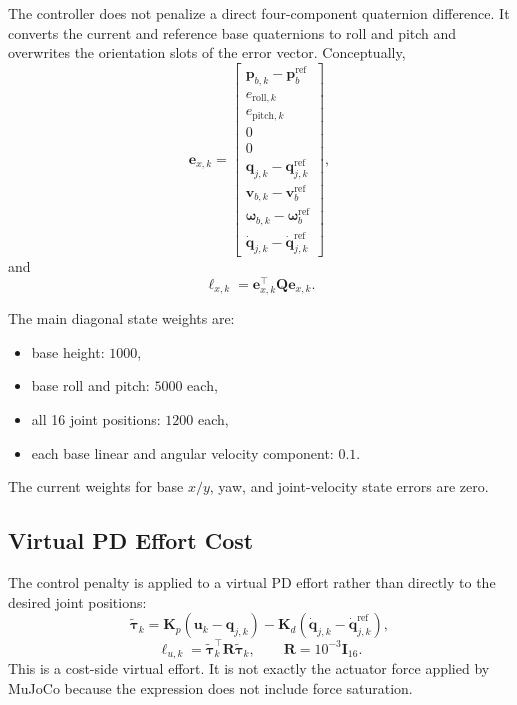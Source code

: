 \documentclass[11pt,a4paper]{article}
\begin{document}
The controller does not penalize a direct four-component quaternion
difference. It converts the current and reference base quaternions to roll and
pitch and overwrites the orientation slots of the error vector. Conceptually,
\begin{equation}
  \bm{e}_{x,k}=
  \begin{bmatrix}
    \bm{p}_{b,k}-\bm{p}^{\mathrm{ref}}_b\\
    e_{\mathrm{roll},k}\\
    e_{\mathrm{pitch},k}\\
    0\\
    0\\
    \bm{q}_{j,k}-\bm{q}^{\mathrm{ref}}_{j,k}\\
    \bm{v}_{b,k}-\bm{v}^{\mathrm{ref}}_b\\
    \bm{\omega}_{b,k}-\bm{\omega}^{\mathrm{ref}}_b\\
    \dot{\bm{q}}_{j,k}-\dot{\bm{q}}^{\mathrm{ref}}_{j,k}
  \end{bmatrix},
\end{equation}
and
\begin{equation}
  \ell_{x,k}=\bm{e}_{x,k}^{\top}\bm{Q}\bm{e}_{x,k}.
\end{equation}

The main diagonal state weights are:
\begin{itemize}
  \item base height: $1000$,
  \item base roll and pitch: $5000$ each,
  \item all 16 joint positions: $1200$ each,
  \item each base linear and angular velocity component: $0.1$.
\end{itemize}
The current weights for base $x/y$, yaw, and joint-velocity state errors are
zero.

\subsection{Virtual PD Effort Cost}

The control penalty is applied to a virtual PD effort rather than directly to
the desired joint positions:
\begin{equation}
  \tilde{\bm{\tau}}_k=
  \bm{K}_p(\bm{u}_k-\bm{q}_{j,k})
  -\bm{K}_d
  (\dot{\bm{q}}_{j,k}-\dot{\bm{q}}^{\mathrm{ref}}_{j,k}),
\end{equation}
\begin{equation}
  \ell_{u,k}=
  \tilde{\bm{\tau}}_k^\top\bm{R}\tilde{\bm{\tau}}_k,
  \qquad
  \bm{R}=10^{-3}\bm{I}_{16}.
\end{equation}
This is a cost-side virtual effort. It is not exactly the actuator force
applied by MuJoCo because the expression does not include force saturation.
\end{document}
